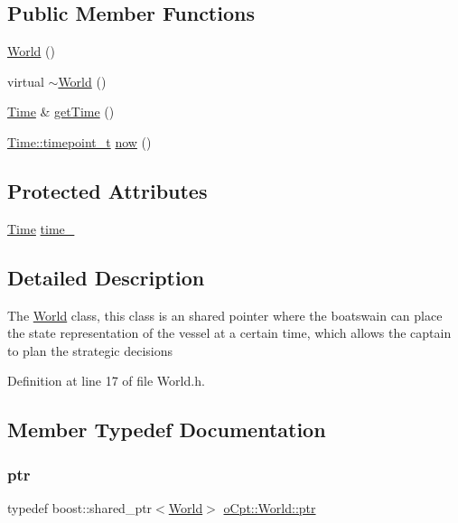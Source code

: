 \subsection*{Public Member Functions}
\begin{DoxyCompactItemize}
\item 
\hyperlink{classo_cpt_1_1_world_adc3d3e562ec4f5979b8da40bf8bef36c}{World} ()
\item 
virtual \hyperlink{classo_cpt_1_1_world_a74dd3c254805c7dd16353b7b7e93dc45}{$\sim$\+World} ()
\item 
\hyperlink{classo_cpt_1_1_world_1_1_time}{Time} \& \hyperlink{classo_cpt_1_1_world_a505f4c14270cfd34d806bd04c4b67f95}{get\+Time} ()
\item 
\hyperlink{classo_cpt_1_1_world_1_1_time_a6a6e782c3c90622c1c7070b0a223ec4c}{Time\+::timepoint\+\_\+t} \hyperlink{classo_cpt_1_1_world_a82235ee23e403f81d38c04b813cdeb23}{now} ()
\end{DoxyCompactItemize}
\subsection*{Protected Attributes}
\begin{DoxyCompactItemize}
\item 
\hyperlink{classo_cpt_1_1_world_1_1_time}{Time} \hyperlink{classo_cpt_1_1_world_a2f93632f34dd13d0a61eec6d8d2879ff}{time\+\_\+}
\end{DoxyCompactItemize}


\subsection{Detailed Description}
The \hyperlink{classo_cpt_1_1_world}{World} class, this class is an shared pointer where the boatswain can place the state representation of the vessel at a certain time, which allows the captain to plan the strategic decisions 

Definition at line 17 of file World.\+h.



\subsection{Member Typedef Documentation}
\hypertarget{classo_cpt_1_1_world_aa6e591e3096d5de71e0cec9039663d67}{}\label{classo_cpt_1_1_world_aa6e591e3096d5de71e0cec9039663d67} 
\subsubsection{\texorpdfstring{ptr}{ptr}}
{\footnotesize\ttfamily typedef boost\+::shared\+\_\+ptr$<$\hyperlink{classo_cpt_1_1_world}{World}$>$ \hyperlink{classo_cpt_1_1_world_aa6e591e3096d5de71e0cec9039663d67}{o\+Cpt\+::\+World\+::ptr}}



